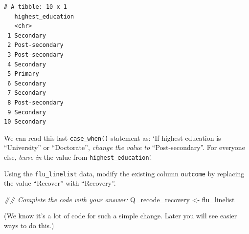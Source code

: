 \documentclass[
  letterpaper,
  DIV=11,
  numbers=noendperiod]{scrreprt}
\newenvironment{Shaded}{\begin{snugshade}}{\end{snugshade}}
\newcommand{\DocumentationTok}[1]{\textcolor[rgb]{0.37,0.37,0.37}{\textit{#1}}}
\newcommand{\NormalTok}[1]{\textcolor[rgb]{0.00,0.23,0.31}{#1}}
\newcommand{\OtherTok}[1]{\textcolor[rgb]{0.00,0.23,0.31}{#1}}
\begin{document}
\begin{verbatim}
# A tibble: 10 x 1
   highest_education
   <chr>            
 1 Secondary        
 2 Post-secondary   
 3 Post-secondary   
 4 Secondary        
 5 Primary          
 6 Secondary        
 7 Secondary        
 8 Post-secondary   
 9 Secondary        
10 Secondary        
\end{verbatim}

We can read this last \texttt{case\_when()} statement as: `If highest
education is ``University'' or ``Doctorate'', \emph{change the value to}
``Post-secondary''. For everyone else, \emph{leave in} the value from
\texttt{highest\_education}'.

\begin{tcolorbox}[enhanced jigsaw, titlerule=0mm, colback=white, left=2mm, breakable, opacitybacktitle=0.6, colbacktitle=quarto-callout-tip-color!10!white, colframe=quarto-callout-tip-color-frame, bottomtitle=1mm, opacityback=0, coltitle=black, arc=.35mm, toptitle=1mm, title=\textcolor{quarto-callout-tip-color}{\faLightbulb}\hspace{0.5em}{Practice}, leftrule=.75mm, toprule=.15mm, bottomrule=.15mm, rightrule=.15mm]

Using the \texttt{flu\_linelist} data, modify the existing column
\texttt{outcome} by replacing the value ``Recover'' with ``Recovery''.

\begin{Shaded}
\begin{Highlighting}[]
\DocumentationTok{\#\# Complete the code with your answer:}
\NormalTok{Q\_recode\_recovery }\OtherTok{\textless{}{-}} 
\NormalTok{  flu\_linelist }
\end{Highlighting}
\end{Shaded}

(We know it's a lot of code for such a simple change. Later you will see
easier ways to do this.)

\end{tcolorbox}
\end{document}
